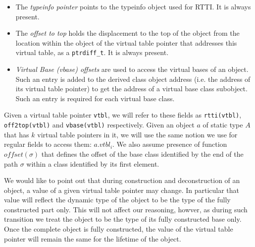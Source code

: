 \documentclass[preprint]{sigplanconf}
\makeatletter
\DeclareRobustCommand{\code}[1]{{\lstinline[breaklines=false,escapechar=@]{#1}}}
\makeatother
\begin{document}
\begin{itemize}
\item The \emph{typeinfo pointer} points to the typeinfo object used for RTTI. 
      It is always present.  
\item The \emph{offset to top} holds the displacement to the top of the object 
      from the location within the object of the virtual table pointer that 
      addresses this virtual table, as a \code{ptrdiff_t}. It is always present.
\item \emph{Virtual Base (vbase) offsets} are used to access the virtual bases 
      of an object. Such an entry is added to the derived class object address 
      (i.e. the address of its virtual table pointer) to get the address of a 
      virtual base class subobject. Such an entry is required for each virtual 
      base class.
\end{itemize}

\noindent
Given a virtual table pointer \code{vtbl}, we will refer to these fields as 
\code{rtti(vtbl)}, \code{off2top(vtbl)} and \code{vbase(vtbl)} respectively. 
Given an object $a$ of static type $A$ that has $k$ virtual table pointers in 
it, we will use the same notion we use for regular fields to access them: 
$a.vtbl_i$. We also assume presence of function $offset(\sigma)$ that defines 
the offset of the base class identified by the end of the path $\sigma$ within a 
class identified by its first element.

We would like to point out that during construction and deconstruction of an 
object, a value of a given virtual table pointer may change. In particular that 
value will reflect the dynamic type of the object to be the type of the fully 
constructed part only. This will not affect our reasoning, howver, as during 
such transition we treat the object to be the type of its fully constructed 
base only. Once the complete object is fully constructed, the value of the 
virtual table pointer will remain the same for the lifetime of the object.

\end{document}
